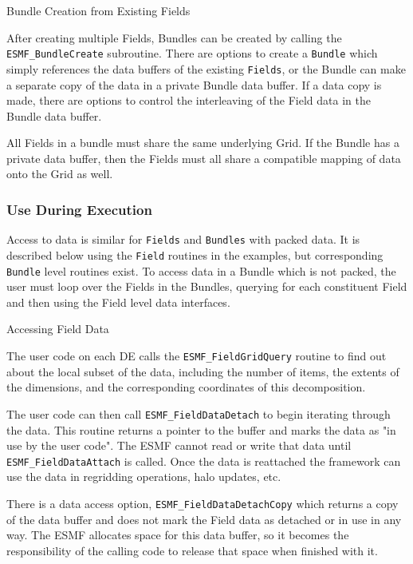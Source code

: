 \begin{description}

\item{Bundle Creation from Existing Fields}

After creating multiple Fields, Bundles can be created
by calling the {\tt ESMF\_BundleCreate} subroutine.  There are
options to create a {\tt Bundle} which simply references
the data buffers of the existing {\tt Fields}, 
or the Bundle can make a separate copy of the data in a private 
Bundle data buffer.  If a data copy is made, there are options to
control the interleaving of the Field data in the Bundle data buffer.

All Fields in a bundle must share the same underlying Grid.
If the Bundle has a private data buffer, then the Fields must
all share a compatible mapping of data onto the Grid as well.

\end{description}

\subsubsection{Use During Execution}

Access to data is similar for {\tt Fields} and {\tt Bundles} with
packed data.  It is described below using the {\tt Field}
routines in the examples, but corresponding {\tt Bundle} level
routines exist.  To access data in a
Bundle which is not packed, the user must loop over the
Fields in the Bundles, querying for each
constituent Field and then using the Field level data interfaces.

\begin{description}

\item{Accessing Field Data}

The user code on each DE calls the {\tt ESMF\_FieldGridQuery}
routine to find out about the local subset of the data, including
the number of items, the extents
of the dimensions, and the corresponding coordinates of this
decomposition.

The user code can then call {\tt ESMF\_FieldDataDetach} to
begin iterating through the data.  This routine returns a
pointer to the buffer and marks the data as "in use by
the user code".  The ESMF cannot read or write that
data until {\tt ESMF\_FieldDataAttach} is called.  Once the data
is reattached the framework can use the data in regridding 
operations, halo updates, etc.  

There is a data access option, {\tt ESMF\_FieldDataDetachCopy}
which returns a copy of the data buffer and does not mark the
Field data as detached or in use in any way.  The ESMF 
allocates space for this data buffer, so it becomes the
responsibility of the calling code to release that space 
when finished with it.

\end{description}


